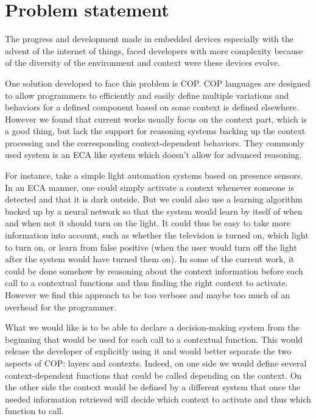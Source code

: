 \documentclass[a4paper]{article}
\begin{document}
\section{Problem statement}
\label{section:problemstatement}
The progress and development made in embedded devices especially with the advent of the internet of things, faced developers with more complexity because of the diversity of the environment and context were  these devices evolve.

One solution developed to face this problem is COP. COP languages are designed to allow programmers to efficiently and easily define multiple variations and behaviors for a defined component based on some context is defined elsewhere. However we found that current works usually focus on the context part, which is a good thing, but lack the support for reasoning systems backing up the context processing and the corresponding context-dependent behaviors. They commonly used system is an ECA like system which doesn't allow for advanced reasoning.

For instance, take a simple light automation systems based on presence sensors. In an ECA manner, one could simply activate a context whenever someone is detected and that it is dark outside. But we could also use a learning algorithm backed up by a neural network so that the system would learn by itself of when and when not it should turn on the light. It could thus be easy to take more information into account, such as whether the television is turned on, which light to turn on, or learn from false positive (when the user would turn off the light after the system would have turned them on). In some of the current work, it could be done somehow by reasoning about the context information before each call to a contextual functions and thus finding the right context to activate. However we find this approach to be too verbose and maybe too much of an overhead for the programmer.

What we would like is to be able to declare a decision-making system from the beginning that would be used for each call to a contextual function. This would release the developer of explicitly using it and would better separate the two aspects of COP: layers and contexts. Indeed, on one side we would define several context-dependent functions that could be called depending on the context. On the other side the context would be defined by a different system that once the needed information retrieved will decide which context to activate and thus which function to call.
\end{document}
